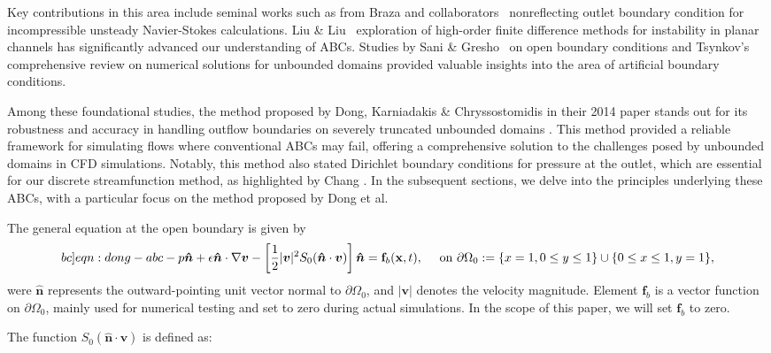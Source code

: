\documentclass{article}
\numberwithin{equation}{section}
\begin{document}
Key contributions in this area include seminal works such as from Braza and collaborators~\cite{Jin:1993, Kourta:1987,Persillon:1998}  nonreflecting outlet boundary condition for incompressible unsteady Navier-Stokes calculations. Liu \& Liu~\cite{Liu:1993} exploration of high-order finite difference methods for instability in planar channels has significantly advanced our understanding of ABCs. Studies by Sani \& Gresho~\cite{Sani:1994} on open boundary conditions and Tsynkov's~\cite{Tsynkov:1998} comprehensive review on numerical solutions for unbounded domains  provided valuable insights into the area of artificial boundary conditions.

Among these foundational studies, the method proposed by Dong, Karniadakis \& Chryssostomidis in their 2014 paper stands out for its robustness and accuracy in handling outflow boundaries on severely truncated unbounded domains \cite{Dong:2014}. This method provided a reliable framework for simulating flows where conventional ABCs may fail, offering a comprehensive solution to the challenges posed by unbounded domains in CFD simulations. Notably, this method also stated Dirichlet boundary conditions for pressure at the outlet, which are essential for our discrete streamfunction method, as highlighted by Chang \cite{Chang:2002}. In the subsequent sections, we delve into the principles underlying these ABCs, with a particular focus on the method proposed by Dong et al. 

The general equation at the open boundary is given  by
\begin{equation}\label[bc]{eqn:dong-abc}
-p \boldsymbol{\hat{n}}+\epsilon \boldsymbol{\hat{n}} \cdot \nabla \boldsymbol{v}-\left[\frac{1}{2}|\boldsymbol{v}|^2 S_0(\boldsymbol{\hat{n}} \cdot \boldsymbol{v})\right] \boldsymbol{\hat{n}}=\mathbf{f}_b(\mathbf{x}, t), \quad \text { on } \partial \Omega_0:=\{x=1,0\leq y\leq 1\}\cup \{ 0\leq x \leq 1, y=1\},
\end{equation}
were $\boldsymbol{\hat{n}}$ represents the outward-pointing unit vector normal to $\partial \Omega_0$, and $|\boldsymbol{v}|$ denotes the velocity magnitude. Element $\mathbf{f}_b$ is a vector function on $\partial \Omega_0$, mainly used for numerical testing and set to zero during actual simulations. In the scope of this paper, we will set $\mathbf{f}_b$ to zero. 

The function $S_0(\boldsymbol{\hat{n}} \cdot \boldsymbol{v})$ is defined as:
\end{document}

